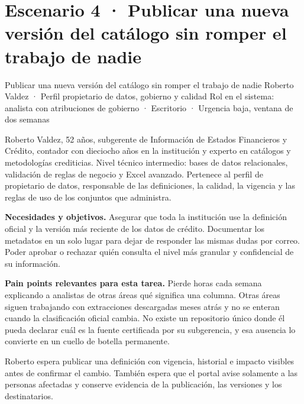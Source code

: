 \clearpage
\section{Escenario 4 · Publicar una nueva versión del catálogo sin romper el trabajo de nadie}

  {Publicar una nueva versión del catálogo sin romper el trabajo de nadie}
  {Roberto Valdez · Perfil propietario de datos, gobierno y calidad}
  {Rol en el sistema: analista con atribuciones de gobierno · Escritorio · Urgencia baja, ventana de dos semanas}


Roberto Valdez, 52 años, subgerente de Información de Estados Financieros y Crédito, contador
con dieciocho años en la institución y experto en catálogos y metodologías crediticias. Nivel
técnico intermedio: bases de datos relacionales, validación de reglas de negocio y Excel
avanzado. Pertenece al perfil de propietario de datos, responsable de las definiciones, la
calidad, la vigencia y las reglas de uso de los conjuntos que administra.

\textbf{\textcolor{uxnavy}{Necesidades y objetivos.}} Asegurar que toda la institución use la
definición oficial y la versión más reciente de los datos de crédito. Documentar los metadatos
en un solo lugar para dejar de responder las mismas dudas por correo. Poder aprobar o rechazar
quién consulta el nivel más granular y confidencial de su información.

\textbf{\textcolor{uxnavy}{Pain points relevantes para esta tarea.}} Pierde horas cada semana
explicando a analistas de otras áreas qué significa una columna. Otras áreas siguen trabajando
con extracciones descargadas meses atrás y no se enteran cuando la clasificación oficial
cambia. No existe un repositorio único donde él pueda declarar cuál es la fuente certificada
por su subgerencia, y esa ausencia lo convierte en un cuello de botella permanente.


Roberto espera publicar una definición con vigencia, historial e impacto visibles antes de
confirmar el cambio. También espera que el portal avise solamente a las personas afectadas y
conserve evidencia de la publicación, las versiones y los destinatarios.

